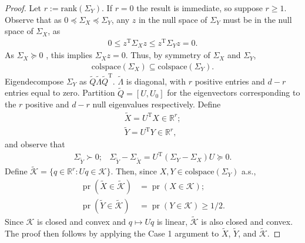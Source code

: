 \documentclass[10pt,a4paper]{amsart}
\def\T{{ \mathrm{\scriptscriptstyle T} }}
\begin{document}
\begin{proof}
Let $r := \text{rank}(\Sigma_Y)$. If $r=0$ the result is immediate, so suppose $r\geq 1$. Observe that as $0\preceq\Sigma_X\preceq\Sigma_Y$, any $z$ in the null space of $\Sigma_Y$ must be in the null space of $\Sigma_X$, as
\begin{align*} 0\leq z^\T\Sigma_X z\leq z^\T\Sigma_Y z = 0.\end{align*} As $\Sigma_X\succeq 0$ , this implies $\Sigma_Xz = 0$. Thus, by symmetry of $\Sigma_X$ and $\Sigma_Y$, 
\begin{align*}\text{colspace}(\Sigma_X)\subseteq \text{colspace}(\Sigma_Y).\end{align*} Eigendecompose $\Sigma_Y$ as $\tilde{Q}\tilde{\Lambda} \tilde{Q}^\T$. $\tilde{\Lambda}$ is diagonal, with $r$ positive entries and $d-r$ entries equal to zero. Partition $\tilde{Q}=[U,U_0]$ for the eigenvectors corresponding to the $r$ positive and $d-r$ null eigenvalues respectively. Define 
\begin{align*} \tilde{X} = U^\T X \in \mathbb{R}^r;\\\tilde{Y} = U^\T Y \in \mathbb{R}^r,\end{align*} and observe that 
\begin{align*} \Sigma_{\tilde{Y}}\succ 0;\;\;\;\Sigma_{\tilde{Y}} - \Sigma_{\tilde{X}} = U^\T(\Sigma_Y-\Sigma_X)U \succeq 0.\end{align*}Define $\tilde{\mathcal{K}} = \{q\in\mathbb{R}^r: U q \in \mathcal{K}\}$.  Then, since $X, Y \in \text{colspace}(\Sigma_Y)$ a.s., 
\begin{align*}\operatorname{pr}(\tilde{X}\in \tilde{\mathcal{K}}) &= \operatorname{pr}(X\in \mathcal{K});\\ \operatorname{pr}(\tilde{Y}\in \tilde{\mathcal{K}}) &= \operatorname{pr}(Y\in \mathcal{K})\geq 1/2.\end{align*} 
Since $\mathcal{K}$ is closed and convex and $q\mapsto Uq$ is linear, $\tilde{\mathcal{K}}$ is also closed and convex. The proof then follows by applying the Case 1 argument to $\tilde{X}$, $\tilde{Y}$, and $\tilde{\mathcal{K}}$. 
\end{proof}
\end{document}
